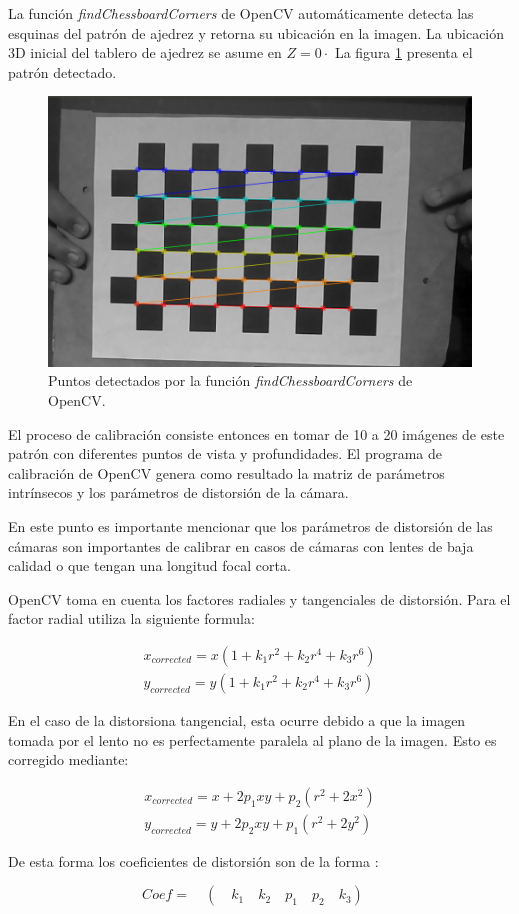 La función \textit{findChessboardCorners} de OpenCV automáticamente detecta las esquinas del patrón de ajedrez y retorna su ubicación en la imagen. La ubicación 3D inicial del tablero de ajedrez se asume en $Z=0·$ La figura \ref{imagen:CalibracionAjedrez} presenta el patrón detectado.


\begin{figure}[H]
	\centering
	\includegraphics[width=0.7\linewidth]{imagenes/prototipo/Calibracion/cal1}
		
	\caption[Detección de esquinas]{Puntos detectados por la función \textit{findChessboardCorners} de OpenCV.}
	\label{imagen:CalibracionAjedrez}
\end{figure}


El proceso de calibración consiste entonces en tomar de 10 a 20 imágenes de este patrón con diferentes puntos de vista y profundidades. El programa de calibración de OpenCV genera como resultado la matriz de parámetros intrínsecos y los parámetros de distorsión de la cámara.

En este punto es importante mencionar que los parámetros de distorsión de las cámaras son importantes de calibrar en casos de cámaras con lentes de baja calidad o que tengan una longitud focal corta. 

OpenCV toma en cuenta los factores radiales y tangenciales de distorsión. Para el factor radial utiliza la siguiente formula:

\begin{align}
{ x }_{ corrected }=x(1+k_{ 1 }{ r }^{ 2 }+k_{ 2 }{ r }^{ 4 }+k_{ 3 }{ r }^{ 6 })\\ { y }_{ corrected }=y(1+k_{ 1 }{ r }^{ 2 }+k_{ 2 }{ r }^{ 4 }+k_{ 3 }{ r }^{ 6 })
\end{align}

En el caso de la distorsiona tangencial, esta ocurre debido a que la imagen tomada por el lento no es perfectamente paralela al plano de la imagen. Esto es corregido mediante:


\begin{align}
{ x }_{ corrected }=x+2p_{ 1 }xy+p_{ 2 }({ r }^{ 2 }+2x^{ 2 })\\ { y }_{ corrected }=y+2p_{ 2 }xy+p_{ 1 }({ r }^{ 2 }+2y^{ 2 })
\end{align}


De esta forma los coeficientes de distorsión son de la forma :

\begin{equation}
Coef =\quad (\quad { k }_{ 1 }\quad { k }_{ 2 }\quad p_{ 1 }\quad p_{ 2 }\quad { k }_{ 3 })\quad 
\end{equation}

	




